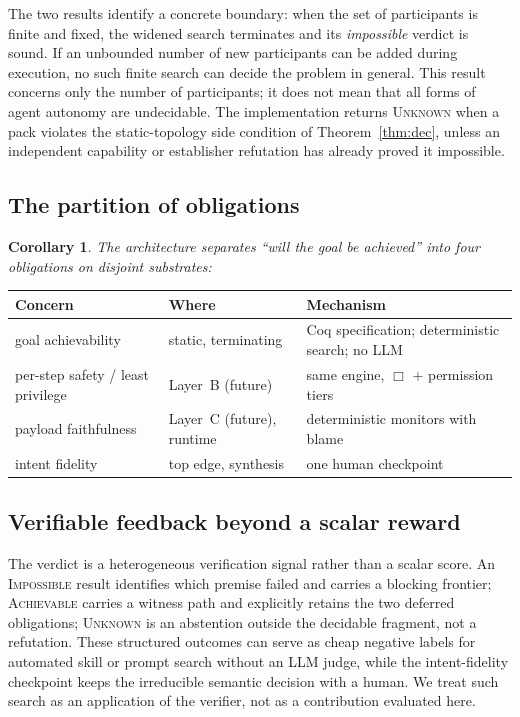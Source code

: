 \documentclass{article}
\theoremstyle{plain}
\newtheorem{corollary}{Corollary}
\theoremstyle{definition}
\def \bgc {}
\def \egc {}
\begin{document}
\noindent The two results identify a concrete boundary: \bgc when the set of
participants is finite and fixed, the widened search terminates and its
\emph{impossible} verdict is sound. If an unbounded number of new participants
can be added during execution, no such finite search can decide the problem in
general.\egc
This result concerns only the number of participants; it does not mean that all
forms of agent autonomy are undecidable.
The implementation returns \textsc{Unknown} when a pack violates the
static-topology side condition of Theorem~\ref{thm:dec}, unless an independent
capability or establisher refutation has already proved it impossible.

\subsection{The partition of obligations}
\begin{corollary}\label{cor:tri}
The architecture separates ``will the goal be achieved'' into four obligations on disjoint
substrates:
\end{corollary}
\begin{center}\small
\begin{tabular}{@{}p{.27\linewidth}p{.22\linewidth}p{.43\linewidth}@{}}
\toprule
\textbf{Concern} & \textbf{Where} & \textbf{Mechanism}\\
\midrule
goal achievability & static, \bgc terminating\egc\ & Coq specification; deterministic search; no LLM\\
per-step safety / least privilege & Layer~B (future) & same engine, $\Box$ + permission tiers\\
payload faithfulness & Layer~C (future), runtime & deterministic monitors with blame\\
intent fidelity & top edge, synthesis & one human checkpoint\\
\bottomrule
\end{tabular}
\end{center}

\subsection{Verifiable feedback beyond a scalar reward}
The verdict is a heterogeneous verification signal rather than a scalar score.
An \textsc{Impossible} result identifies which premise failed and carries a
blocking frontier; \textsc{Achievable} carries a witness path and explicitly
retains the two deferred obligations; \textsc{Unknown} is an abstention outside
the decidable fragment, not a refutation. These structured outcomes can serve as
cheap negative labels for automated skill or prompt search without an LLM judge,
while the intent-fidelity checkpoint keeps the irreducible semantic decision
with a human. We treat such search as an application of the verifier, not as a
contribution evaluated here.
\end{document}
